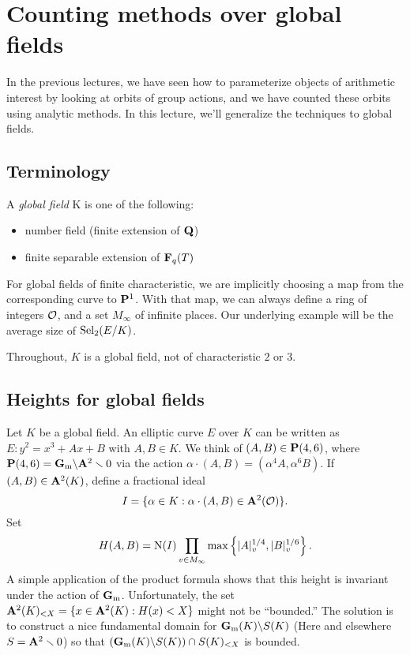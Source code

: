 
\section{Counting methods over global fields}\label{sec:wang-ii}





In the previous lectures, we have seen how to parameterize objects of 
arithmetic interest by looking at orbits of group actions, and we have counted 
these orbits using analytic methods. In this lecture, we'll generalize the 
techniques to global fields. 





\subsection{Terminology}

A \emph{global field} K is one of the following:
\begin{itemize}
  \item number field (finite extension of $\mathbf{Q}$)
  \item finite separable extension of $\mathbf{F}_q(T)$
\end{itemize}
For global fields of finite characteristic, we are implicitly choosing a map 
from the corresponding curve to $\mathbf{P}^1$. With that map, we can always define a 
ring of integers $\mathcal{O}$, and a set $M_\infty$ of infinite places. Our underlying 
example will be the average size of $\operatorname{Sel}_2(E/K)$. 

Throughout, $K$ is a global field, not of characteristic $2$ or $3$. 





\subsection{Heights for global fields}

Let $K$ be a global field. An elliptic curve $E$ over $K$ can be written as 
$E:y^2=x^3+A x+B$ with $A,B\in K$. We think of $(A,B)\in \mathbf{P}(4,6)$, where 
$\mathbf{P}(4,6)=\mathbf{G}_{\mathrm{m}}\backslash \mathbf{A}^2\smallsetminus 0$ via the action 
$\alpha\cdot (A,B)=(\alpha^4A,\alpha^6 B)$. If $(A,B)\in \mathbf{A}^2(K)$, define 
a fractional ideal 
\[
  I = \{\alpha\in K:\alpha\cdot (A,B)\in \mathbf{A}^2(\mathcal{O})\} .
\]
Set 
\[
  H(A,B) = \operatorname{N}(I)\prod_{v\in M_\infty} \max\left\{|A|_v^{1/4},|B|_v^{1/6}\right\} .
\]
A simple application of the product formula shows that this height is 
invariant under the action of $\mathbf{G}_{\mathrm{m}}$. Unfortunately, the set 
$\mathbf{A}^2(K)_{<X}=\{x\in \mathbf{A}^2(K):H(x)<X\}$ might not be ``bounded.'' The solution 
is to construct a nice fundamental domain for 
$\mathbf{G}_{\mathrm{m}}(K)\backslash S(K)$ (Here and elsewhere 
$S=\mathbf{A}^2\smallsetminus 0$) so that 
$(\mathbf{G}_{\mathrm{m}}(K)\backslash S(K))\cap S(K)_{<X}$ is bounded. 





